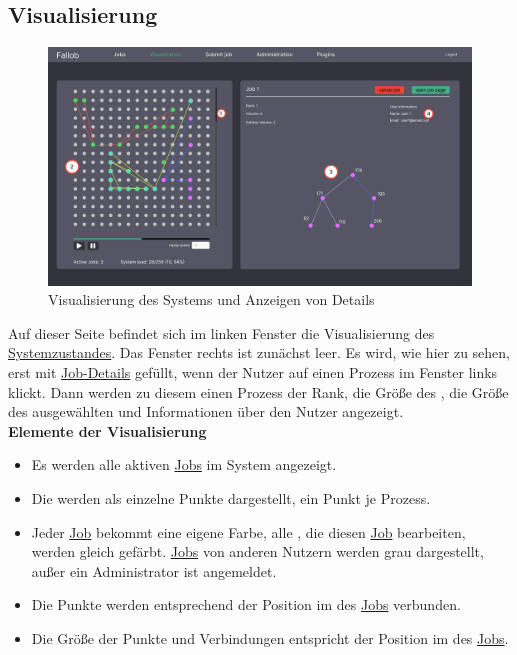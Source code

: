 \newpage
\subsection{Visualisierung}
\label{pages:visualization}
\begin{figure}[H]
    \centering
    \includegraphics[width=\textwidth]{images-interface/v6_interface/visualization_page_6.pdf}
    \caption{Visualisierung des Systems und Anzeigen von Details}
    \label{fig:visualization-page}
\end{figure}
Auf dieser Seite befindet sich im linken Fenster die Visualisierung des \hyperref[B:Systemzustand]{Systemzustandes}. Das Fenster rechts ist zunächst leer. Es wird, wie hier zu sehen, erst mit \hyperref[B:Job-Details]{Job-Details} gefüllt, wenn der \gls{Nutzer} auf einen Prozess im Fenster links klickt. Dann werden zu diesem einen Prozess der Rank, die Größe des , die Größe des ausgewählten  und Informationen über den \gls{Nutzer} angezeigt.\\

\textbf{Elemente der Visualisierung}

\label{vis:appearance}
\begin{itemize}[noitemsep]
        \item Es werden alle aktiven \hyperref[B:Jobs]{Jobs} im System angezeigt.
        \item Die  werden als einzelne Punkte dargestellt, ein Punkt je \gls{Prozess}.
        \item Jeder \hyperref[B:Jobs]{Job} bekommt eine eigene Farbe, alle , die diesen \hyperref[B:Jobs]{Job} bearbeiten, werden gleich gefärbt.
        \hyperref[B:Jobs]{Jobs} von anderen Nutzern werden grau dargestellt, außer ein \gls{Administrator} ist angemeldet.
        \item Die Punkte werden entsprechend der Position im  des \hyperref[B:Jobs]{Jobs} verbunden.
        \item Die Größe der Punkte und Verbindungen entspricht der Position im  des  \hyperref[B:Jobs]{Jobs}.
\end{itemize}


